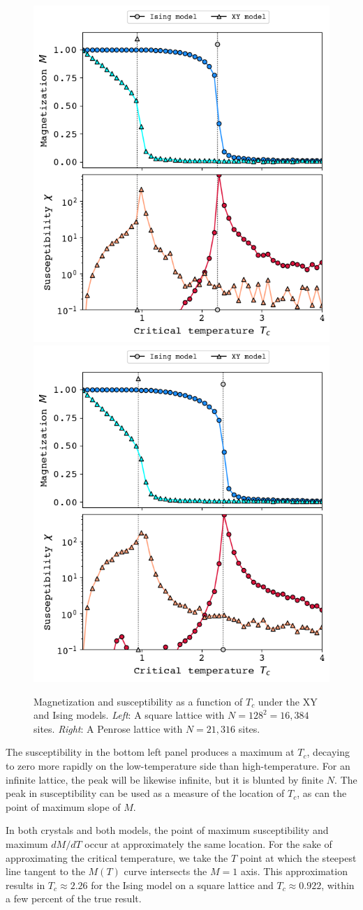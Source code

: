 \documentclass[amsmath,amssymb,aps,twocolumn,nofootinbib]{revtex4-2}
\begin{document}
\begin{figure}
  \centering
  \includegraphics[width=0.49\linewidth]{../figs/square.png}\hfill
  \includegraphics[width=0.49\linewidth]{../figs/penrose.png}
  \caption{Magnetization and susceptibility as a function of $T_c$ under the XY and Ising models. \textit{Left}: A square lattice with $N=128^2=16,384$ sites. \textit{Right}: A Penrose lattice with $N=21,316$ sites.}
  \label{fig:square}
\end{figure}

The susceptibility in the bottom left panel produces a maximum at $T_c$, decaying to zero more rapidly on the low-temperature side than high-temperature. For an infinite lattice, the peak will be likewise infinite, but it is blunted by finite $N$. The peak in susceptibility can be used as a measure of the location of $T_c$, as can the point of maximum slope of $M$.

In both crystals and both models, the point of maximum susceptibility and maximum $dM/dT$ occur at approximately the same location. For the sake of approximating the critical temperature, we take the $T$ point at which the steepest line tangent to the $M(T)$ curve intersects the $M=1$ axis. This approximation results in $T_c\approx 2.26$ for the Ising model on a square lattice and $T_c\approx 0.922$, within a few percent of the true result.
\end{document}

